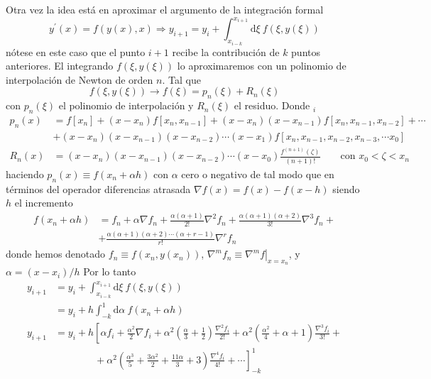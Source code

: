 \documentclass[spanish,titlepage,11pt]{article}
\begin{document}
Otra vez la idea est\'{a} en aproximar el argumento de la integraci\'{o}n
formal
\[
y^{\prime}(x)=f(y(x),x)\Rightarrow y_{i+1}=y_{i}+\int_{x_{i-k}}^{x_{i+1}%
}\mathrm{d}\xi\ f\left(  \xi,y(\xi)\right)
\]
n\'{o}tese en este caso que el punto $i+1$ recibe la contribuci\'{o}n de $k$
puntos anteriores. El integrando $f\left(  \xi,y(\xi)\right)  $ lo
aproximaremos con un polinomio de interpolaci\'{o}n de Newton de orden $n$.
Tal que
\[
f\left(  \xi,y(\xi)\right)  \rightarrow f\left(  \xi\right)  =p_{n}\left(
\xi\right)  +R_{n}\left(  \xi\right)
\]
con $p_{n}\left(  \xi\right)  $ el polinomio de interpolaci\'{o}n y
$R_{n}\left(  \xi\right)  $ el residuo. Donde $_{i}$%
\begin{align*}
p_{n}\left(  x\right)   &  =f\left[  x_{n}\right]  +\left(  x-x_{n}\right)
f\left[  x_{n},x_{n-1}\right]  +\left(  x-x_{n}\right)  \left(  x-x_{n-1}%
\right)  f\left[  x_{n},x_{n-1},x_{n-2}\right]  +\cdots\\
&  +\left(  x-x_{n}\right)  \left(  x-x_{n-1}\right)  \left(  x-x_{n-2}%
\right)  \cdots\left(  x-x_{1}\right)  f\left[  x_{n},x_{n-1},x_{n-2}%
,x_{n-3},\cdots x_{0}\right] \\
R_{n}\left(  x\right)   &  =\left(  x-x_{n}\right)  \left(  x-x_{n-1}\right)
\left(  x-x_{n-2}\right)  \cdots\left(  x-x_{0}\right)  \frac{f^{(n+1)}%
(\zeta)}{\left(  n+1\right)  !}\qquad\text{con }x_{0}<\zeta<x_{n}%
\end{align*}
haciendo $p_{n}\left(  x\right)  \equiv f\left(  x_{n}+\alpha h\right)  $ con
$\alpha$ cero o negativo de tal modo que en t\'{e}rminos del operador
diferencias atrasada $\nabla f(x)=f(x)-f(x-h)$ siendo $h$ el incremento
\begin{align*}
f\left(  x_{n}+\alpha h\right)   &  =f_{n}+\alpha\nabla f_{n}+\frac
{\alpha\left(  \alpha+1\right)  }{2!}\nabla^{2}f_{n}+\frac{\alpha\left(
\alpha+1\right)  \left(  \alpha+2\right)  }{3!}\nabla^{3}f_{n}+\\
&  +\frac{\alpha\left(  \alpha+1\right)  \left(  \alpha+2\right)
\cdots\left(  \alpha+r-1\right)  }{r!}\nabla^{r}f_{n}%
\end{align*}
donde hemos denotado $f_{n}\equiv f\left(  x_{n},y(x_{n})\right)  $,
$\nabla^{m}f_{n}\equiv\left.  \nabla^{m}f\right|  _{x=x_{n}}$, y
$\alpha=\left(  x-x_{i}\right)  /h$ Por lo tanto
\begin{align*}
y_{i+1}  &  =y_{i}+\int_{x_{i-k}}^{x_{i+1}}\mathrm{d}\xi\ f\left(  \xi
,y(\xi)\right) \\
&  =y_{i}+h\int_{-k}^{1}\mathrm{d}\alpha\ f\left(  x_{n}+\alpha h\right) \\
y_{i+1}  &  =y_{i}+h\left[  \alpha f_{i}+\frac{\alpha^{2}}{2}\nabla
f_{i}+\alpha^{2}\left(  \frac{\alpha}{3}+\frac{1}{2}\right)  \frac{\nabla
^{2}f_{i}}{2!}+\alpha^{2}\left(  \frac{\alpha^{2}}{4}+\alpha+1\right)
\frac{\nabla^{3}f_{i}}{3!}+\right. \\
&  \left.  \qquad\qquad+\alpha^{2}\left(  \frac{\alpha^{3}}{5}+\frac
{3\alpha^{2}}{2}+\frac{11\alpha}{3}+3\right)  \frac{\nabla^{4}f_{i}}%
{4!}+\cdots\right]  _{-k}^{1}%
\end{align*}
\end{document}
